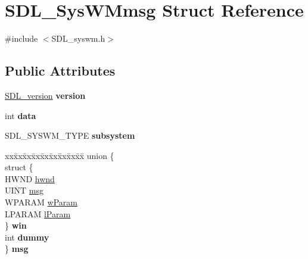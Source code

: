 \hypertarget{structSDL__SysWMmsg}{\section{S\+D\+L\+\_\+\+Sys\+W\+Mmsg Struct Reference}
\label{structSDL__SysWMmsg}
}


{\ttfamily \#include $<$S\+D\+L\+\_\+syswm.\+h$>$}

\subsection*{Public Attributes}
\begin{DoxyCompactItemize}
\item 
\hypertarget{structSDL__SysWMmsg_a95f9aae58d18ee8fac556416b322a5fb}{\hyperlink{structSDL__version}{S\+D\+L\+\_\+version} {\bfseries version}}\label{structSDL__SysWMmsg_a95f9aae58d18ee8fac556416b322a5fb}

\item 
\hypertarget{structSDL__SysWMmsg_ae2399a5ef24f5a1b39ad053c71ce5a43}{int {\bfseries data}}\label{structSDL__SysWMmsg_ae2399a5ef24f5a1b39ad053c71ce5a43}

\item 
\hypertarget{structSDL__SysWMmsg_a7c3900af5ea797f1318fc77ee0ecd11b}{S\+D\+L\+\_\+\+S\+Y\+S\+W\+M\+\_\+\+T\+Y\+P\+E {\bfseries subsystem}}\label{structSDL__SysWMmsg_a7c3900af5ea797f1318fc77ee0ecd11b}

\item 
\hypertarget{structSDL__SysWMmsg_a0bf134b573674d437af6c9b826bc1303}{\begin{tabbing}
xx\=xx\=xx\=xx\=xx\=xx\=xx\=xx\=xx\=\kill
union \{\\
\hypertarget{unionSDL__SysWMmsg_1_1@16_a0647d11e921359d47f3dae6b91d414b8}{\>struct \{\\
\>\>HWND \hyperlink{structSDL__SysWMmsg_a55cf9583b5eddfe60a5c9851f9cce457}{hwnd}\\
\>\>UINT \hyperlink{structSDL__SysWMmsg_a74894ed060d5508ab06aac584154d61e}{msg}\\
\>\>WPARAM \hyperlink{structSDL__SysWMmsg_a7463730478d90ebc031d83098f3f74fc}{wParam}\\
\>\>LPARAM \hyperlink{structSDL__SysWMmsg_a24c1e4c3cb8d9781d34e5d99df66ac36}{lParam}\\
\>\} {\bfseries win}\\
\hypertarget{unionSDL__SysWMmsg_1_1@16_a8faf13f90f2477157b42b631308cd900}{\>int {\bfseries dummy}\\
\} {\bfseries msg}}\label{structSDL__SysWMmsg_a0bf134b573674d437af6c9b826bc1303}
\\

}
\end{tabbing}}
\end{DoxyCompactItemize}
